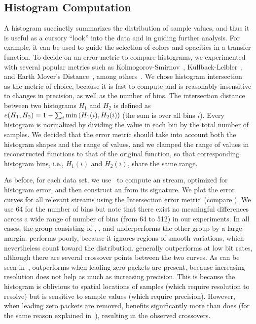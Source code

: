 \subsection{Histogram Computation}\label{sec:histogram}

A histogram succinctly summarizes the distribution of sample values, and thus it is useful as a
cursory ``look'' into the data and in guiding further analysis. For example, it can be used to guide
the selection of colors and opacities in a transfer function. To decide on an error metric to
compare histograms, we experimented with several popular metrics such as
Kolmogorov-Smirnov~\cite{smirnov1948}, Kullback-Leibler~\cite{kullback1951}, and Earth Mover's
Distance~\cite{emd1998}, among others~\cite{Hellinger1909,Bhattacharyya1943}. We chose histogram
intersection~\cite{histogram_intersection1991} as the metric of choice, because it is fast to
compute and is reasonably insensitive to changes in precision, as well as the number of bins. The
intersection distance between two histograms $H_1$ and $H_2$ is defined as
$e(H_1,H_2)=1-\sum_{i}{\min{(H_1(i),H_2(i))}}$ (the sum is over all bins $i$). Every histogram is
normalized by dividing the value in each bin by the total number of samples. We decided that the
error metric should take into account both the histogram shapes and the range of values, and we
clamped the range of values in reconstructed functions to that of the original function, so that
corresponding histogram bins, i.e., $H_1(i)$ and $H_2(i)$, share the same range.

As before, for each data set, we use~ to compute an \shop stream, optimized for
histogram error, and then construct an \shsg from its signature. We plot the error curves for all
relevant streams using the Intersection error metric~(compare
). We use 64 for the number of bins but note that there exist
no meaningful differences across a wide range of number of bins (from 64 to 512) in our experiments.
In all cases, the group consisting of \sbit, \slvl, and \smag underperforms the other group by a
large margin. \smag performs poorly, because it ignores regions of smooth variations, which
nevertheless count toward the distribution. \slvl generally outperforms \sbit at low bit rates,
although there are several crossover points between the two curves. As can be seen
in~, \slvl outperforms \sbit when leading zero packets are present,
because increasing resolution does not help as much as increasing precision. This is because the
histogram is oblivious to spatial locations of samples (which require resolution to resolve) but is
sensitive to sample values (which require precision). However, when leading zero packets are
removed, \sbit benefits significantly more than \slvl does (for the same reason explained
in~), resulting in the observed crossovers.


